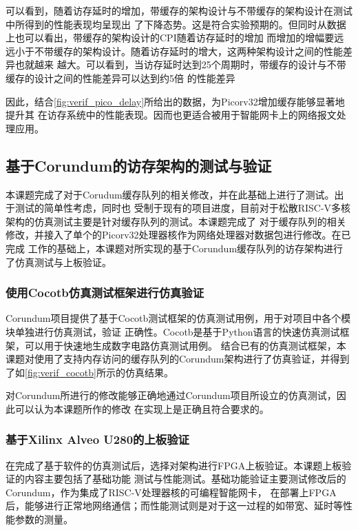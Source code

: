 可以看到，随着访存延时的增加，带缓存的架构设计与不带缓存的架构设计在测试中所得到的性能表现均呈现出
了下降态势。这是符合实验预期的。但同时从数据上也可以看出，带缓存的架构设计的CPI随着访存延时的增加
而增加的增幅要远远小于不带缓存的架构设计。随着访存延时的增大，这两种架构设计之间的性能差异也就越来
越大。可以看到，当访存延时达到25个周期时，带缓存的设计与不带缓存的设计之间的性能差异可以达到约5倍
的性能差异

因此，结合\autoref{fig:verif_pico_delay}所给出的数据，为Picorv32增加缓存能够显著地提升其
在访存系统中的性能表现。因而也更适合被用于智能网卡上的网络报文处理应用。

\subsection{基于Corundum的访存架构的测试与验证}

本课题完成了对于Corudum缓存队列的相关修改，并在此基础上进行了测试。出于测试的简单性考虑，同时也
受制于现有的项目进度，目前对于松散RISC-V多核架构的仿真测试主要是针对缓存队列的测试。本课题完成了
对于缓存队列的相关修改，并接入了单个的Picorv32处理器核作为网络处理器对数据包进行修改。在已完成
工作的基础上，本课题对所实现的基于Corundum缓存队列的访存架构进行了仿真测试与上板验证。

\subsubsection{使用Cocotb仿真测试框架进行仿真验证}

Corundum项目提供了基于Cocotb测试框架的仿真测试用例，用于对项目中各个模块单独进行仿真测试，验证
正确性。Cocotb是基于Python语言的快速仿真测试框架，可以用于快速地生成数字电路仿真测试用例\cite{cocotb_doc}。
结合已有的仿真测试框架，本课题对使用了支持内存访问的缓存队列的Corundum架构进行了仿真验证，并得到
了如\autoref{fig:verif_cocotb}所示的仿真结果。


对Corundum所进行的修改能够正确地通过Corundum项目所设立的仿真测试，因此可以认为本课题所作的修改
在实现上是正确且符合要求的。

\subsubsection{基于Xilinx Alveo U280的上板验证}

在完成了基于软件的仿真测试后，选择对架构进行FPGA上板验证。本课题上板验证的内容主要包括了基础功能
测试与性能测试。基础功能验证主要测试修改后的Corundum，作为集成了RISC-V处理器核的可编程智能网卡，
在部署上FPGA后，能够进行正常地网络通信；而性能测试则是对于这一过程的如带宽、延时等性能参数的测量。

